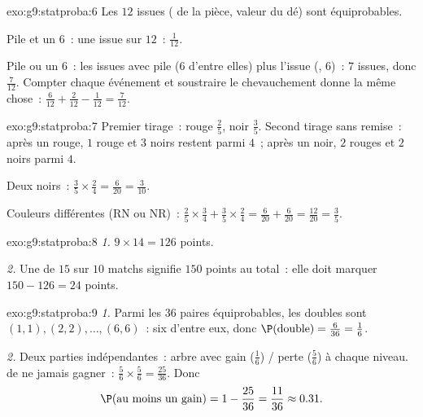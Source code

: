 \begin{solution}{exo:g9:statproba:6}
Les $12$ issues ( de la pièce, valeur du dé) sont équiprobables.

Pile et un $6$~: une issue sur $12$~: $\frac{1}{12}$.

Pile ou un $6$~: les issues avec pile ($6$ d'entre elles) plus l'issue
(, $6$)~: $7$ issues, donc $\frac{7}{12}$. Compter chaque événement
et soustraire le chevauchement donne la même chose~:
$\frac{6}{12} + \frac{2}{12} - \frac{1}{12} = \frac{7}{12}$.
\end{solution}

\begin{solution}{exo:g9:statproba:7}
Premier tirage~: rouge $\frac25$, noir $\frac35$. Second tirage sans
remise~: après un rouge, $1$ rouge et $3$ noirs restent parmi $4$~;
après un noir, $2$ rouges et $2$ noirs parmi $4$.

Deux noirs~: $\frac35 \times \frac24 = \frac{6}{20} = \frac{3}{10}$.

Couleurs différentes (RN ou NR)~:
$\frac25 \times \frac34 + \frac35 \times \frac24
= \frac{6}{20} + \frac{6}{20} = \frac{12}{20} = \frac35$.
\end{solution}

\begin{solution}{exo:g9:statproba:8}
\emph{1.} $9 \times 14 = 126$ points.

\emph{2.} Une  de $15$ sur $10$ matchs signifie $150$ points au
total~: elle doit marquer $150 - 126 = 24$ points.
\end{solution}

\begin{solution}{exo:g9:statproba:9}
\emph{1.} Parmi les $36$ paires équiprobables, les doubles sont
$(1,1), (2,2), \dots, (6,6)$~: six d'entre eux, donc
$\P(\text{double}) = \frac{6}{36} = \frac16$.

\emph{2.} Deux parties indépendantes~: arbre avec gain ($\frac16$) /
perte ($\frac56$) à chaque niveau.  de ne jamais gagner~:
$\frac56 \times \frac56 = \frac{25}{36}$. Donc
\[
\P(\text{au moins un gain}) = 1 - \frac{25}{36} = \frac{11}{36}
\approx 0.31 .
\]
\end{solution}

